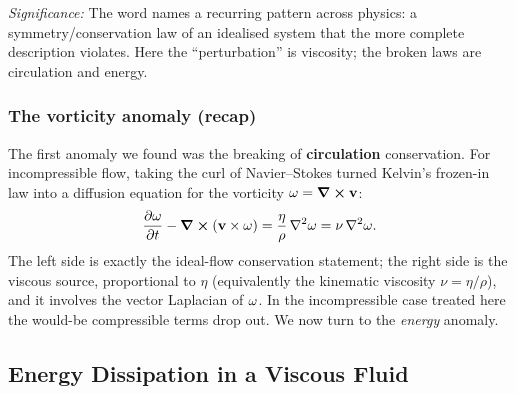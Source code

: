 \documentclass[../main.tex]{subfiles}
\begin{document}
\textit{Significance:} The word names a recurring pattern across physics: a symmetry/conservation law of an idealised system that the more complete description violates. Here the ``perturbation'' is viscosity; the broken laws are circulation and energy.


\subsubsection*{The vorticity anomaly (recap)}
The first anomaly we found was the breaking of \textbf{circulation} conservation. For incompressible flow, taking the curl of Navier--Stokes turned Kelvin's frozen-in law into a diffusion equation for the vorticity $\mathbf{\omega}=\curl\mathbf{v}$:
\begin{equation}
  \pdv{\mathbf{\omega}}{t}-\curl(\mathbf{v}\times\mathbf{\omega})=\frac{\eta}{\rho}\,\nabla^2\mathbf{\omega}=\nu\,\nabla^2\mathbf{\omega} .
  \label{eq:lec19_vorticity}
\end{equation}
The left side is exactly the ideal-flow conservation statement; the right side is the viscous source, proportional to $\eta$ (equivalently the kinematic viscosity $\nu=\eta/\rho$), and it involves the vector Laplacian of $\mathbf{\omega}$. In the incompressible case treated here the would-be compressible terms drop out. We now turn to the \emph{energy} anomaly.


\subsection{Energy Dissipation in a Viscous Fluid}\label{sec:lec19:dissipation}
\end{document}
